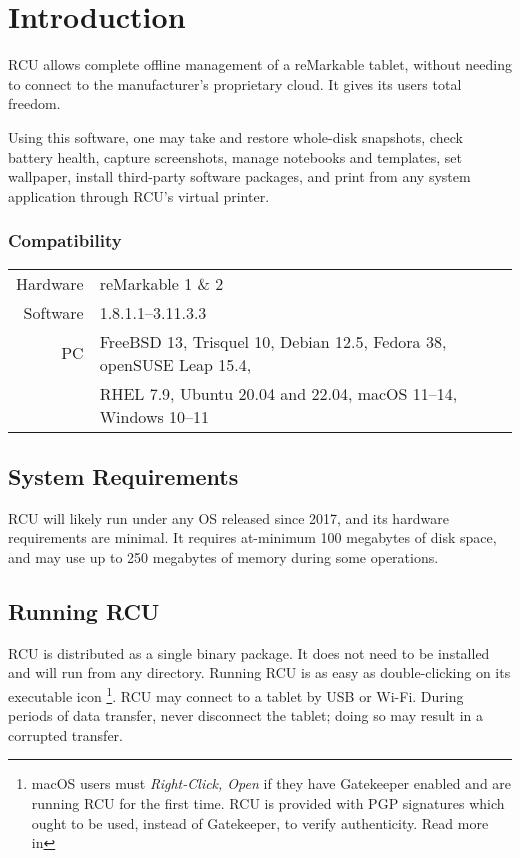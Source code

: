 \setcounter{chapter}{0}
\renewcommand{\thechapter}{\arabic{chapter}}
\chapter{Introduction}
\setcounter{page}{1}

RCU allows complete offline management of a reMarkable tablet, without needing to connect to the manufacturer's proprietary cloud. It gives its users total freedom.

Using this software, one may take and restore whole-disk snapshots, check battery health, capture screenshots, manage notebooks and templates, set wallpaper, install third-party software packages, and print from any system application through RCU's virtual printer.

\subsection{Compatibility}
\label{sec:compatibility}
\begin{tabular}{ r | l }
  Hardware & reMarkable 1 \& 2 \\
  Software & 1.8.1.1--3.11.3.3 \\
  PC & FreeBSD 13, Trisquel 10, Debian 12.5, Fedora 38, openSUSE Leap 15.4, \\
  & RHEL 7.9, Ubuntu 20.04 and 22.04, macOS 11--14, Windows 10--11 \\
\end{tabular}

\section{System Requirements}
RCU will likely run under any OS released since 2017, and its hardware requirements are minimal. It requires at-minimum 100 megabytes of disk space, and may use up to 250 megabytes of memory during some operations.

\section{Running RCU}
\label{sec:running-rcu}
RCU is distributed as a single binary package. It does not need to be installed and will run from any directory. Running RCU is as easy as double-clicking on its executable icon \footnote{macOS users must \textit{Right-Click, Open} if they have Gatekeeper enabled and are running RCU for the first time. RCU is provided with PGP signatures which ought to be used, instead of Gatekeeper, to verify authenticity. Read more in \linebreak {}}. RCU may connect to a tablet by USB or Wi-Fi. During periods of data transfer, never disconnect the tablet; doing so may result in a corrupted transfer.

